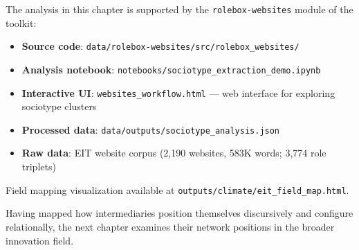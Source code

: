 \documentclass[../main.tex]{subfiles}
\begin{document}
\vspace{0.5em}
\begin{replicationbox}
The analysis in this chapter is supported by the \texttt{rolebox-websites} module of the \RoleBox{} toolkit:
\begin{itemize}[leftmargin=*, itemsep=0.2em]
\item \textbf{Source code}: \texttt{data/rolebox-websites/src/rolebox\_websites/}
\item \textbf{Analysis notebook}: \texttt{notebooks/sociotype\_extraction\_demo.ipynb}
\item \textbf{Interactive UI}: \texttt{websites\_workflow.html} --- web interface for exploring sociotype clusters
\item \textbf{Processed data}: \texttt{data/outputs/sociotype\_analysis.json}
\item \textbf{Raw data}: EIT website corpus (2,190 websites, 583K words; 3,774 role triplets)
\end{itemize}
Field mapping visualization available at \texttt{outputs/climate/eit\_field\_map.html}.
\end{replicationbox}

\vspace{1em}
Having mapped how intermediaries position themselves discursively and configure relationally, the next chapter examines their network positions in the broader innovation field.
\end{document}

